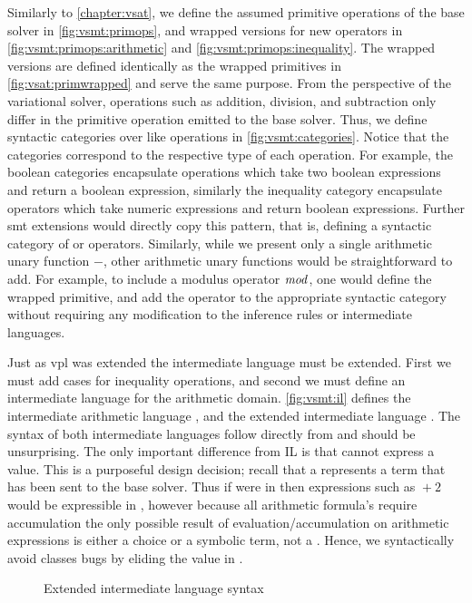 Similarly to \autoref{chapter:vsat}, we define the assumed primitive operations
of the base solver in \autoref{fig:vsmt:primops}, and wrapped versions for new
operators in \autoref{fig:vsmt:primops:arithmetic} and
\autoref{fig:vsmt:primops:inequality}. The wrapped versions are defined
identically as the wrapped primitives in \autoref{fig:vsat:primwrapped} and
serve the same purpose.
%
From the perspective of the variational solver, operations such as addition,
division, and subtraction only differ in the primitive operation emitted to the
base solver. Thus, we define syntactic categories over like operations in
\autoref{fig:vsmt:categories}. Notice that the categories correspond to the
respective type of each operation. For example, the boolean categories
encapsulate operations which take two boolean expressions and return a boolean
expression, similarly the inequality category encapsulate operators which take
numeric expressions and return boolean expressions. Further \ac{smt} extensions
would directly copy this pattern, that is, defining a syntactic category of
 or  operators. Similarly, while we present
only a single arithmetic unary function $-$, other arithmetic unary functions
would be straightforward to add. For example, to include a modulus operator
$\mathit{mod}$, one would define the wrapped primitive, and add the operator to the
appropriate syntactic category without requiring any modification to the
inference rules or intermediate languages.

Just as \ac{vpl} was extended the intermediate language must be extended. First
we must add cases for inequality operations, and second we must define an
intermediate language for the arithmetic domain.
%
\autoref{fig:vsmt:il} defines the intermediate arithmetic language \eAR, and the
extended intermediate language \eIL. The syntax of both intermediate languages
follow directly from \evpl and should be unsurprising. The only important
difference from IL is that \eAR cannot express a \unit{} value. This is a
purposeful design decision; recall that a \unit{} represents a term that has
been sent to the base solver. Thus if \unit{} were in \eAR then expressions such
as $\unit{} + 2$ would be expressible in \eAR, however because all arithmetic
formula's require accumulation the only possible result of
evaluation/accumulation on arithmetic expressions is either a choice or a
symbolic term, not a \unit{}. Hence, we syntactically avoid classes bugs by
eliding the \unit{} value in \eAR.
% 
\begin{figure}
  
  \caption{Extended intermediate language syntax}%
  \label{fig:vsmt:il}
\end{figure}

